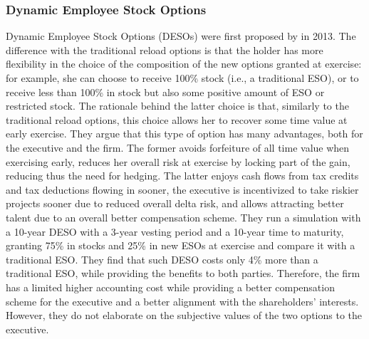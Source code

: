 \subsubsection{Dynamic Employee Stock Options}
    Dynamic Employee Stock Options (DESOs) were first proposed by \cite{huang2013dynamic} in 2013.  The difference with the traditional reload options is that the holder has more flexibility in the choice of the composition of the new options granted at exercise: for example, she can choose to receive 100\% stock (i.e., a traditional ESO), or to receive less than 100\% in stock but also some positive amount of ESO or restricted stock. The rationale behind the latter choice is that, similarly to the traditional reload options, this choice allows her to recover some time value at early exercise. They argue that this type of option has many advantages, both for the executive and the firm. The former avoids forfeiture of all time value when exercising early, reduces her overall risk at exercise by locking part of the gain, reducing thus the need for hedging. The latter enjoys cash flows from tax credits and tax deductions flowing in sooner, the executive is incentivized to take riskier projects sooner due to reduced overall delta risk, and allows attracting better talent due to an overall better compensation scheme. 
    They run a simulation with a 10-year DESO with a 3-year vesting period and a 10-year time to maturity, granting 75\% in stocks and 25\% in new ESOs at exercise and compare it with a traditional ESO. They find that such DESO costs only 4\% more than a traditional ESO, while providing the benefits to both parties. Therefore, the firm has a limited higher accounting cost while providing a better compensation scheme for the executive and a better alignment with the shareholders' interests. However, they do not elaborate on the subjective values of the two options to the executive.

